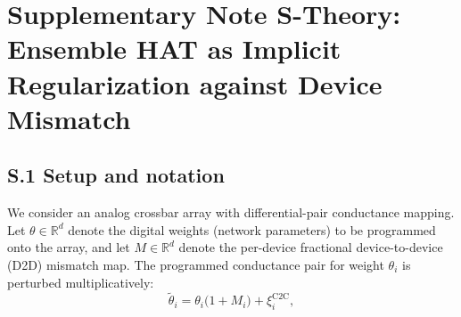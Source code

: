 \section*{Supplementary Note S-Theory: Ensemble HAT as Implicit Regularization against Device Mismatch}
\label{supp:theory-ensemble-hat}

\subsection*{S.1 Setup and notation}

We consider an analog crossbar array with differential-pair conductance mapping. Let $\theta \in \mathbb{R}^d$ denote the digital weights (network parameters) to be programmed onto the array, and let $M \in \mathbb{R}^d$ denote the per-device fractional device-to-device (D2D) mismatch map. The programmed conductance pair for weight $\theta_i$ is perturbed multiplicatively:
\begin{equation}
    \tilde{\theta}_i = \theta_i \bigl(1 + M_i\bigr) + \xi_i^{\text{C2C}},
    \label{eq:weight-perturbation}
\end{equation}

